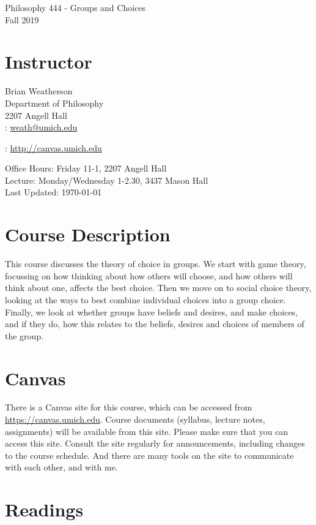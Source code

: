 \documentclass[10pt]{article}
\begin{document}
{\LARGE Philosophy 444 - Groups and Choices}\\[0.5cm]
{\large Fall 2019}

\section*{Instructor}

Brian Weatherson \\
Department of Philosophy \\
2207 Angell Hall \\

\Letter: \href{mailto:weath@umich.edu}{weath@umich.edu}

\ComputerMouse: \href{http://canvas.umich.edu}{http://canvas.umich.edu} 

Office Hours: Friday 11-1, 2207 Angell Hall \\
Lecture: Monday/Wednesday 1-2.30, 3437 Mason Hall  \\
Last Updated: \today

\section*{Course Description}

This course discusses the theory of choice in groups. We start with game theory, focussing on how thinking about how others will choose, and how others will think about one, affects the best choice. Then we move on to social choice theory, looking at the ways to best combine individual choices into a group choice. Finally, we look at whether groups have beliefs and desires, and make choices, and if they do, how this relates to the beliefs, desires and choices of members of the group.

\section*{Canvas}

There is a Canvas site for this course, which can be accessed from \url{https://canvas.umich.edu}. Course documents (syllabus, lecture notes, assignments) will be available from this site. Please make sure that you can access this site. Consult the site regularly for announcements, including changes to the course schedule. And there are many tools on the site to communicate with each other, and with me. 

\section*{Readings}
\end{document}
